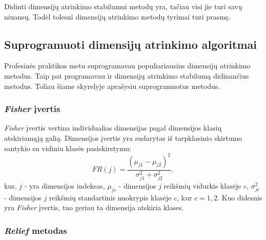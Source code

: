 Didinti dimensijų atrinkimo stabilumui metodų yra, tačiau visi jie turi savų niuansų. Todėl tolesni dimensijų atrinkimo metodų tyrimai turi prasmę. 

\subsection{Suprogramuoti dimensijų atrinkimo algoritmai}

Profesinės praktikos metu suprogramavau populiariausius dimensijų atrinkimo metodus. Taip pat programavau ir dimensijų atrinkimo stabilumą didinančius metodus. Toliau šiame skyrelyje aprašysiu suprogramuotus metodus.

\subsubsection{\textit{Fisher} įvertis}

\textit{Fisher} įvertis vertina individualias dimensijas pagal dimensijos klasių atskiriamąją galią. Dimensijos įvertis yra sudarytas iš tarpklasinio skirtumo santykio su vidiniu klasės pasiskirstymu:
\begin{equation}
 FR(j) = \frac{(\mu_{j1} - \mu_{j2})^2}{\sigma_{j1}^2 + \sigma_{j2}^2},
\end{equation}
kur, 
$j$ - yra dimensijos indeksas, 
$\mu_{jc}$ - dimensijos $j$ reikšmių vidurkis klasėje $c$, 
$\sigma_{jc}^2$ - dimensijos $j$ reikšmių standartinis nuokrypis klasėje $c$, kur $c={1,2}$. Kuo didesnis yra \textit{Fisher} įvertis, tuo geriau ta dimensija atskiria klases.

\subsubsection{\textit{Relief} metodas}

